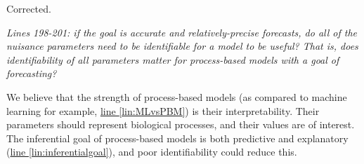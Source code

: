 \documentclass[11pt,letter]{article}
\begin{document}
Corrected.

\begin{mybox}
\emph{Lines 198-201: if the goal is accurate and relatively-precise forecasts, do all of the nuisance parameters need to be identifiable for a model to be useful? That is, does identifiability of all parameters matter for process-based models with a goal of forecasting?}
\end{mybox}

We believe that the strength of process-based models (as compared to machine learning for example, \href{file:forecastflows_r1\#lintarget:MLvsPBM}{line \ref*{lin:MLvsPBM}}) is their interpretability. Their parameters should represent biological processes, and their values are of interest. The inferential goal of process-based models is both predictive and explanatory (\href{file:forecastflows_r1\#lintarget:inferentialgoal}{line \ref*{lin:inferentialgoal}}), and poor identifiability could reduce this.


\end{document}

